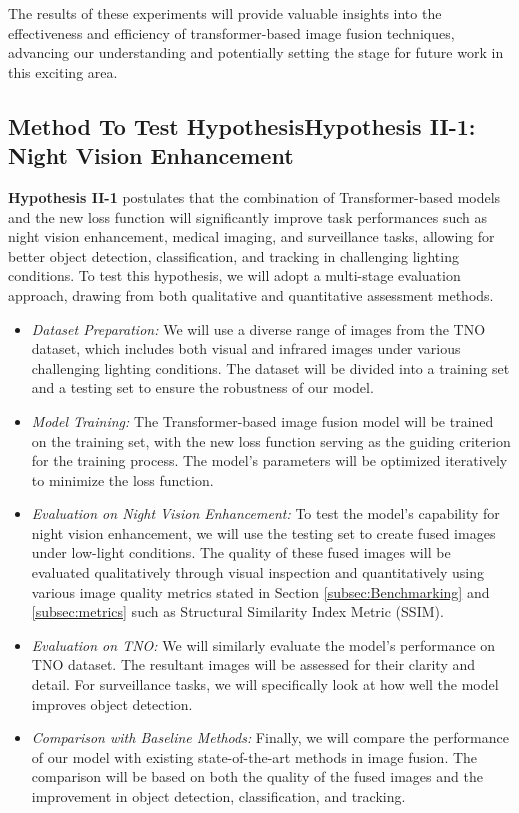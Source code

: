 The results of these experiments will provide valuable insights into the effectiveness and efficiency of transformer-based image fusion techniques, advancing our understanding and potentially setting the stage for future work in this exciting area.

\subsection{Method To Test HypothesisHypothesis II-1: Night Vision Enhancement} \label{subsec:met4}

\textbf{Hypothesis II-1} postulates that the combination of Transformer-based models and the new loss function will significantly improve task performances such as night vision enhancement, medical imaging, and surveillance tasks, allowing for better object detection, classification, and tracking in challenging lighting conditions. To test this hypothesis, we will adopt a multi-stage evaluation approach, drawing from both qualitative and quantitative assessment methods.

\begin{itemize}
    \item \textit{Dataset Preparation:} We will use a diverse range of images from the TNO dataset, which includes both visual and infrared images under various challenging lighting conditions. The dataset will be divided into a training set and a testing set to ensure the robustness of our model.
    \item \textit{Model Training:} The Transformer-based image fusion model will be trained on the training set, with the new loss function serving as the guiding criterion for the training process. The model's parameters will be optimized iteratively to minimize the loss function.
    \item \textit{Evaluation on Night Vision Enhancement:} To test the model's capability for night vision enhancement, we will use the testing set to create fused images under low-light conditions. The quality of these fused images will be evaluated qualitatively through visual inspection and quantitatively using various image quality metrics stated in Section \ref{subsec:Benchmarking} and \ref{subsec:metrics} such as Structural Similarity Index Metric (SSIM).
    \item \textit{Evaluation on TNO:} We will similarly evaluate the model's performance on TNO dataset. The resultant images will be assessed for their clarity and detail. For surveillance tasks, we will specifically look at how well the model improves object detection.
    \item \textit{Comparison with Baseline Methods:} Finally, we will compare the performance of our model with existing state-of-the-art methods in image fusion. The comparison will be based on both the quality of the fused images and the improvement in object detection, classification, and tracking.
\end{itemize}


